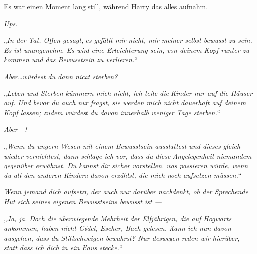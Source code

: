 Es war einen Moment lang still, während Harry das alles aufnahm.

\emph{Ups}.


„\emph{In der Tat. Offen gesagt, es gefällt mir nicht, mir meiner selbst bewusst zu sein. Es ist unangenehm. Es wird eine Erleichterung sein, von deinem Kopf runter zu kommen und das Bewusstsein zu verlieren.}“

\emph{Aber…würdest du dann nicht sterben?}

„\emph{Leben und Sterben kümmern mich nicht, ich teile die Kinder nur auf die Häuser auf. Und bevor du auch nur fragst, sie werden mich nicht dauerhaft auf deinem Kopf lassen; zudem würdest du davon innerhalb weniger Tage sterben.}“

\emph{Aber—!}

„\emph{Wenn du ungern Wesen mit einem Bewusstsein ausstattest und dieses gleich wieder vernichtest, dann schlage ich vor, dass du diese Angelegenheit niemandem gegenüber erwähnst. Du kannst dir sicher vorstellen, was passieren würde, wenn du all den anderen Kindern davon erzählst, die mich noch aufsetzen müssen.}“

\emph{Wenn jemand dich aufsetzt, der auch nur darüber \emph{nachdenkt}, ob der Sprechende Hut sich seines eigenen Bewusstseins bewusst ist —}

„\emph{Ja, ja. Doch die überwiegende Mehrheit der Elfjährigen, die auf Hogwarts ankommen, haben nicht \emph{Gödel, Escher, Bach} gelesen. Kann ich nun davon ausgehen, dass du Stillschweigen bewahrst? Nur \emph{deswegen} reden wir hierüber, statt dass ich dich in ein Haus stecke.}“

